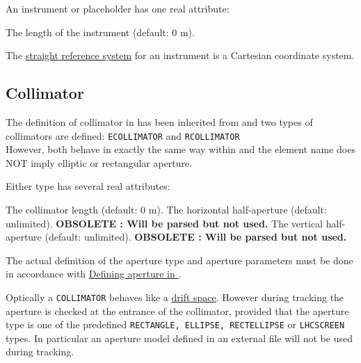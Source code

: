 {

An instrument or placeholder has one real attribute: 
\begin{madlist}
    The length of the instrument (default: 0 m). 
\end{madlist}

The \hyperref[subsec:local_straight]{straight reference system} for an 
instrument is a Cartesian coordinate system.  

\begin{5.02.04}
\section{Collimator}
 
The definition of collimator in \madx has been inherited from \madeight
and two types of collimators are defined: {\tt ECOLLIMATOR} and {\tt RCOLLIMATOR} \\
However, both behave in exactly the same way within \madx and 
the element name does NOT imply elliptic or rectangular aperture.


Either type has several real attributes: 
\begin{madlist}
    The collimator length (default: 0 m). 
    The horizontal half-aperture (default:
     unlimited). \textbf{OBSOLETE : Will be parsed but not used.} 
    The vertical half-aperture (default:
     unlimited). \textbf{OBSOLETE : Will be parsed but not used.} 
\end{madlist}

The actual definition of the aperture type and aperture parameters must
be done in accordance with \hyperref[chap:aperture]{Defining aperture in
  \madx}.   

Optically a {\tt COLLIMATOR} behaves like a \hyperref[sec:drift]{drift space}.  
However during
tracking the aperture is checked at the entrance of the collimator,
provided that the aperture type is one of the predefined {\tt RECTANGLE,
ELLIPSE, RECTELLIPSE} or {\tt LHCSCREEN} types.  In particular an aperture
model defined in an external file will not be used during tracking.  


\end{5.02.04}}

